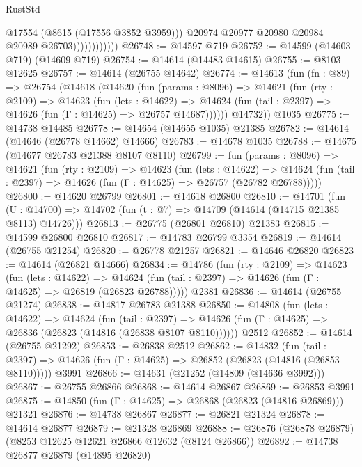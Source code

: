 \begin{lexlean}{RustStd}
\begin{coremodule}
                              @17554
                              (@8615 (@17556 @3852 @3959)))
                            @20974
                            @20977
                            @20980
                            @20984
                            @20989
                            @26703))))))))))))
@26748 := @14597 @719
@26752 := @14599 (@14603 @719) (@14609 @719)
@26754 := @14614 (@14483 @14615)
@26755 := @8103 @12625
@26757 := @14614 (@26755 @14642)
@26774 := @14613
    (fun (fn : @89) =>
    @26754
      (@14618
        (@14620
          (fun (params : @8096) =>
          @14621
            (fun (rty : @2109) =>
            @14623
              (fun (lets : @14622) =>
              @14624 (fun (tail : @2397) => @14626 (fun (Γ : @14625) => @26757 @14687))))))
        @14732))
    @1035
@26775 := @14738 @14485
@26778 := @14654 (@14655 @1035) @21385
@26782 := @14614 (@14646 (@26778 @14662) @14666)
@26783 := @14678 @1035
@26788 := @14675 (@14677 @26783 @21388 @8107 @8110)
@26799 := fun (params : @8096) =>
  @14621
    (fun (rty : @2109) =>
    @14623
      (fun (lets : @14622) =>
      @14624 (fun (tail : @2397) => @14626 (fun (Γ : @14625) => @26757 (@26782 @26788)))))
@26800 := @14620 @26799
@26801 := @14618 @26800
@26810 := @14701
    (fun (U : @14700) => @14702 (fun (t : @7) => @14709 (@14614 (@14715 @21385 @8113) @14726)))
@26813 := @26775 (@26801 @26810) @21383
@26815 := @14599 @26800 @26810
@26817 := @14783 @26799 @3354
@26819 := @14614 (@26755 @21254)
@26820 := @26778 @21257
@26821 := @14646 @26820
@26823 := @14614 (@26821 @14666)
@26834 := @14786
    (fun (rty : @2109) =>
    @14623
      (fun (lets : @14622) =>
      @14624 (fun (tail : @2397) => @14626 (fun (Γ : @14625) => @26819 (@26823 @26788)))))
    @2381
@26836 := @14614 (@26755 @21274)
@26838 := @14817 @26783 @21388
@26850 := @14808
    (fun (lets : @14622) =>
    @14624
      (fun (tail : @2397) =>
      @14626 (fun (Γ : @14625) => @26836 (@26823 (@14816 (@26838 @8107 @8110))))))
    @2512
@26852 := @14614 (@26755 @21292)
@26853 := @26838 @2512
@26862 := @14832
    (fun (tail : @2397) => @14626 (fun (Γ : @14625) => @26852 (@26823 (@14816 (@26853 @8110)))))
    @3991
@26866 := @14631 (@21252 (@14809 (@14636 @3992)))
@26867 := @26755 @26866
@26868 := @14614 @26867
@26869 := @26853 @3991
@26875 := @14850 (fun (Γ : @14625) => @26868 (@26823 (@14816 @26869))) @21321
@26876 := @14738 @26867
@26877 := @26821 @21324
@26878 := @14614 @26877
@26879 := @21328 @26869
@26888 := @26876 (@26878 @26879) (@8253 @12625 @12621 @26866 @12632 (@8124 @26866))
@26892 := @14738 @26877 @26879 (@14895 @26820)

\end{coremodule}
\end{lexlean}
